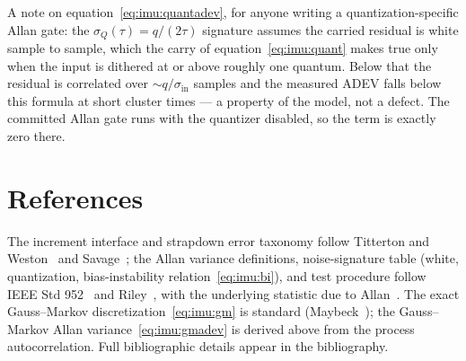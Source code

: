 A note on equation~\eqref{eq:imu:quantadev}, for anyone writing a
quantization-specific Allan gate: the $\sigma_Q(\tau) = q/(2\tau)$
signature assumes the carried residual is white sample to sample, which the
carry of equation~\eqref{eq:imu:quant} makes true only when the input is
dithered at or above roughly one quantum. Below that the residual is
correlated over $\sim q/\sigma_{\mathrm{in}}$ samples and the measured ADEV
falls below this formula at short cluster times --- a property of the
model, not a defect. The committed Allan gate runs with the quantizer
disabled, so the term is exactly zero there.

\section{References}
\label{sec:imu:references}

The increment interface and strapdown error taxonomy follow Titterton and
Weston~\cite{titterton2004} and Savage~\cite{savage1998a}; the Allan
variance definitions, noise-signature table (white, quantization,
bias-instability relation~\eqref{eq:imu:bi}), and test procedure follow
IEEE Std 952~\cite{ieee952} and Riley~\cite{riley2008}, with the
underlying statistic due to Allan~\cite{allan1966}. The exact
Gauss--Markov discretization~\eqref{eq:imu:gm} is standard
(Maybeck~\cite{maybeck1979}); the Gauss--Markov Allan
variance~\eqref{eq:imu:gmadev} is derived above from the process
autocorrelation. Full bibliographic details appear in the bibliography.
